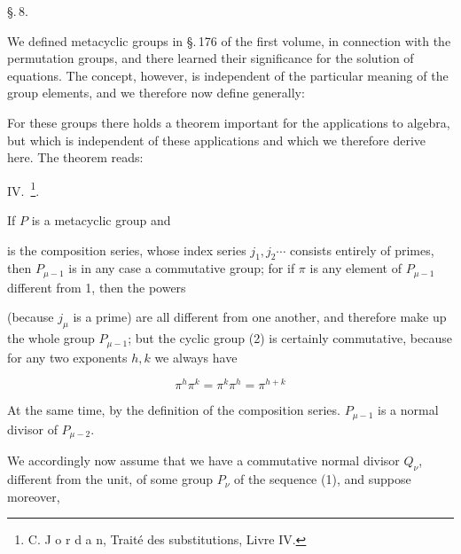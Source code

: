 
\begin{center}
\S.\,8.

\end{center}

We defined metacyclic groups in \S.\,176 of the first volume, in connection with the permutation groups, and there learned their significance for the solution of equations. The concept, however, is independent of the particular meaning of the group elements, and we therefore now define generally:


For these groups there holds a theorem important for the applications to algebra, but which is independent of these applications and which we therefore derive here. The theorem reads:

IV.\ \footnote{C. J o r d a n, Traité des substitutions, Livre IV.}.

If $P$ is a metacyclic group and


is the composition series, whose index series $j_1, j_2 \cdots$ consists entirely of primes, then $P_{\mu-1}$ is in any case a commutative group; for if $\pi$ is any element of $P_{\mu-1}$ different from 1, then the powers


(because $j_\mu$ is a prime) are all different from one another, and therefore make up the whole group $P_{\mu-1}$; but the cyclic group (2) is certainly commutative, because for any two exponents $h, k$ we always have

\[
\pi^h \pi^k = \pi^k \pi^h = \pi^{h+k}
\]

At the same time, by the definition of the composition series. %
$P_{\mu-1}$ is a normal divisor of $P_{\mu-2}$.

We accordingly now assume that we have a commutative normal divisor $Q_\nu$, different from the unit, of some group $P_\nu$ of the sequence (1), and suppose moreover,
